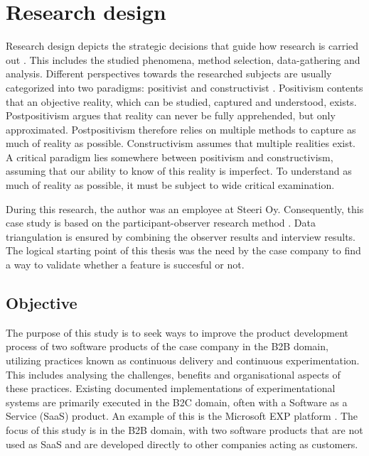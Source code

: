 \documentclass[english, grading]{tktltiki2}
\theoremstyle{definition}
\theoremstyle{remark}
\begin{document}
\section{Research design}
Research design depicts the strategic decisions that guide how research is carried out \cite{denzin2000discipline}. This includes the studied phenomena, method selection, data-gathering and analysis. Different perspectives towards the researched subjects are usually categorized into two paradigms: positivist and constructivist \cite{gephart2004qualitative}. Positivism contents that an objective reality, which can be studied, captured and understood, exists. Postpositivism argues that reality can never be fully apprehended, but only approximated. Postpositivism therefore relies on multiple methods to capture as much of reality as possible. Constructivism assumes that multiple realities exist. A critical paradigm lies somewhere between positivism and constructivism, assuming that our ability to know of this reality is imperfect. To understand as much of reality as possible, it must be subject to wide critical examination. 


During this research, the author was an employee at Steeri Oy. Consequently, this case study is based on the participant-observer research method \cite{strauss1990basics}. Data triangulation is ensured by combining the observer results and interview results. The logical starting point of this thesis was the need by the case company to find a way to validate whether a feature is succesful or not. 

\subsection{Objective} %
The purpose of this study is to seek ways to improve the product development process of two software products of the case company in the B2B domain, utilizing practices known as continuous delivery and continuous experimentation. This includes analysing the challenges, benefits and organisational aspects of these practices. Existing documented implementations of experimentational systems are primarily executed in the B2C domain, often with a Software as a Service (SaaS) product. An example of this is the Microsoft EXP platform \cite{ep}. The focus of this study is in the B2B domain, with two software products that are not used as SaaS and are developed directly to other companies acting as customers. 
\end{document}
